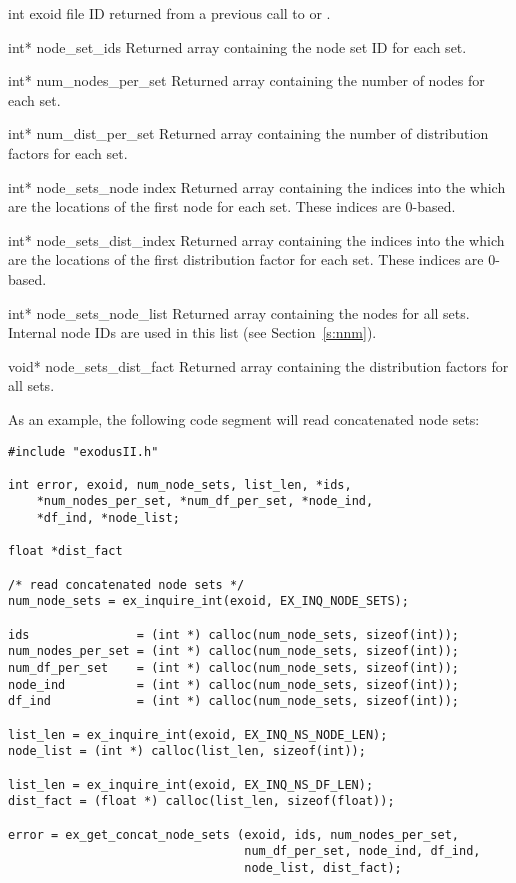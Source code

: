 \begin{parameters}
\item[{int exoid \R{}}]
\exo{} file ID returned from a previous call to  
or .

\item[{int* node_set_ids \W{}}]
Returned array containing the node set ID for each set.

\item[{int* num_nodes_per_set \W{}}]
Returned array containing the number of nodes for each set.

\item[{int* num_dist_per_set \W{}}]
Returned array containing the number of distribution factors for each
set.

\item[{int* node_sets_node index \W{}}]
Returned array containing the indices into the 
which are the locations of the first node for each set. These indices
are 0-based.

\item[{int* node_sets_dist_index \W{}}]
Returned array containing the indices into the 
which are the locations of the first distribution factor for each
set. These indices are 0-based.

\item[{int* node_sets_node_list \W{}}]
Returned array containing the nodes for all sets. Internal node IDs
are used in this list (see Section~\ref{s:nnm}).

\item[{void* node_sets_dist_fact \W{}}]
Returned array containing the distribution factors for all sets.
\end{parameters}

As an example, the following code segment will read concatenated 
node sets:

\begin{lstlisting}
#include "exodusII.h"

int error, exoid, num_node_sets, list_len, *ids, 
    *num_nodes_per_set, *num_df_per_set, *node_ind, 
    *df_ind, *node_list;

float *dist_fact

/* read concatenated node sets */
num_node_sets = ex_inquire_int(exoid, EX_INQ_NODE_SETS);

ids               = (int *) calloc(num_node_sets, sizeof(int));
num_nodes_per_set = (int *) calloc(num_node_sets, sizeof(int));
num_df_per_set    = (int *) calloc(num_node_sets, sizeof(int));
node_ind          = (int *) calloc(num_node_sets, sizeof(int));
df_ind            = (int *) calloc(num_node_sets, sizeof(int));

list_len = ex_inquire_int(exoid, EX_INQ_NS_NODE_LEN);
node_list = (int *) calloc(list_len, sizeof(int));

list_len = ex_inquire_int(exoid, EX_INQ_NS_DF_LEN);
dist_fact = (float *) calloc(list_len, sizeof(float));

error = ex_get_concat_node_sets (exoid, ids, num_nodes_per_set, 
                                 num_df_per_set, node_ind, df_ind, 
                                 node_list, dist_fact);
\end{lstlisting}



